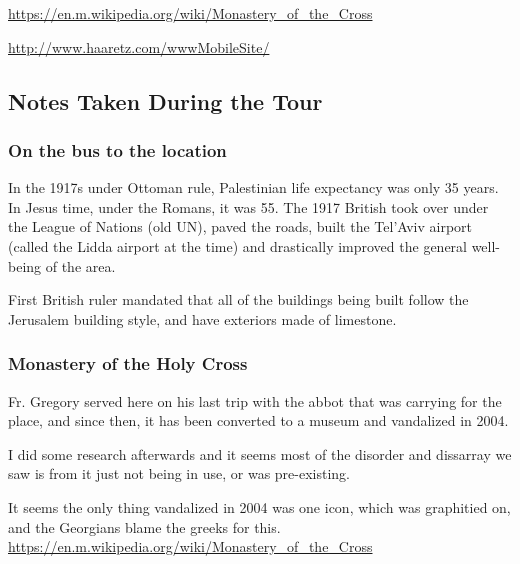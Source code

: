 \documentclass[letterpaper]{report}
\begin{document}
\begin{multicols}{2}
\url{https://en.m.wikipedia.org/wiki/Monastery_of_the_Cross}

\url{http://www.haaretz.com/wwwMobileSite/}

\subsection{Notes Taken During the Tour}

\subsubsection{On the bus to the location}
In the 1917s under Ottoman rule, Palestinian life expectancy was only 35 years. In Jesus time, under the Romans, it was 55. The 1917 British took over under the League of Nations (old UN), paved the roads, built the Tel'Aviv airport (called the Lidda airport at the time) and drastically improved the general well-being of the area.

First British ruler mandated that all of the buildings being built follow the Jerusalem building style, and have exteriors made of limestone.

\subsubsection{Monastery of the Holy Cross}
Fr. Gregory served here on his last trip with the abbot that was carrying for the place, and since then, it has been converted to a museum and vandalized in 2004.

I did some research afterwards and it seems most of the disorder and dissarray we saw is from it just not being in use,
or was pre-existing.

It seems the only thing vandalized in 2004 was one icon, which was graphitied on,
and the Georgians blame the greeks for this.
\url{https://en.m.wikipedia.org/wiki/Monastery_of_the_Cross}

\end{multicols}

\clearpage
\end{document}
